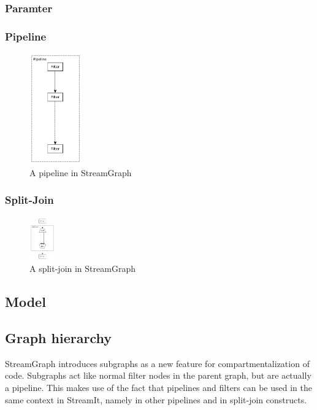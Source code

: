 \documentclass[journal]{IEEEtran}
\begin{document}
\subsubsection{Paramter}
\subsubsection{Pipeline}
\begin{figure}[h]
	\centering
	\includegraphics[width=0.2\textwidth]{PipelineGraphic}
	\caption{A pipeline in StreamGraph}
	\label{fig_filter_node}
\end{figure}
\subsubsection{Split-Join}
\begin{figure}[h]
	\centering
	\includegraphics[width=0.1\textwidth]{SplitJoinGraphic}
	\caption{A split-join in StreamGraph}
	\label{fig_filter_node}
\end{figure}



\subsection{Model}

\subsection{Graph hierarchy}

StreamGraph introduces subgraphs as a new feature for compartmentalization of
code. Subgraphs act like normal filter nodes in the parent graph, but are
actually a pipeline. This makes use of the fact that pipelines and filters can
be used in the same context in StreamIt, namely in other pipelines and in
split-join constructs.
\end{document}
